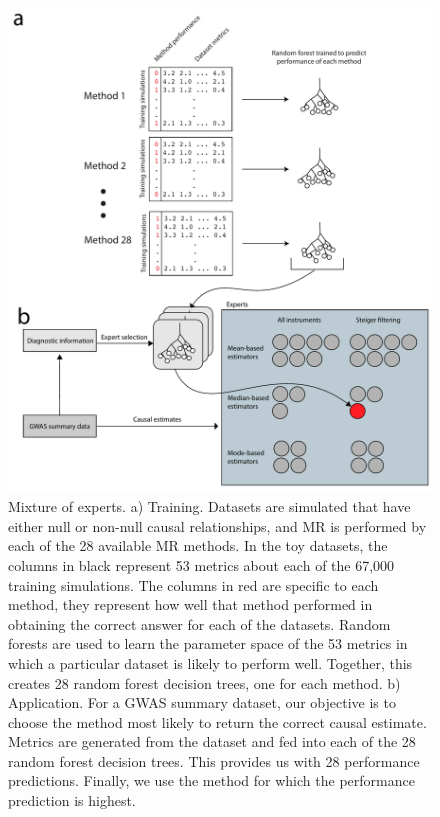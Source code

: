 \documentclass[]{article}
\begin{document}
\begin{figure}
\centering
\includegraphics{images/fig2.pdf}
\caption{Mixture of experts. a) Training. Datasets are simulated that
have either null or non-null causal relationships, and MR is performed
by each of the 28 available MR methods. In the toy datasets, the columns
in black represent 53 metrics about each of the 67,000 training
simulations. The columns in red are specific to each method, they
represent how well that method performed in obtaining the correct answer
for each of the datasets. Random forests are used to learn the parameter
space of the 53 metrics in which a particular dataset is likely to
perform well. Together, this creates 28 random forest decision trees,
one for each method. b) Application. For a GWAS summary dataset, our
objective is to choose the method most likely to return the correct
causal estimate. Metrics are generated from the dataset and fed into
each of the 28 random forest decision trees. This provides us with 28
performance predictions. Finally, we use the method for which the
performance prediction is highest.}
\end{figure}

\newpage
\end{document}

